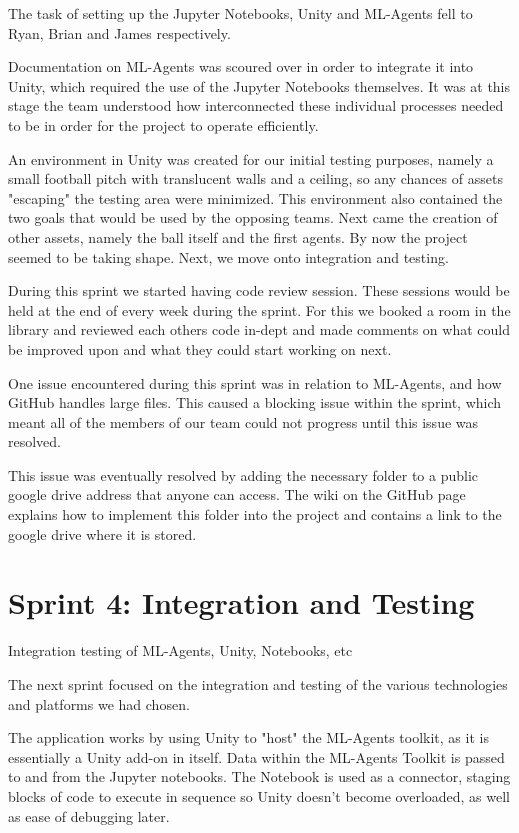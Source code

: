 	The task of setting up the Jupyter Notebooks, Unity and ML-Agents fell to Ryan, Brian and James respectively.
	
	Documentation on ML-Agents was scoured over in order to integrate it into Unity, which required the use of the Jupyter Notebooks themselves. It was at this stage the team understood how interconnected these individual processes needed to be in order for the project to operate efficiently.
	
	An environment in Unity was created for our initial testing purposes, namely a small football pitch with translucent walls and a ceiling, so any chances of assets "escaping" the testing area were minimized. This environment also contained the two goals that would be used by the opposing teams. Next came the creation of other assets, namely the ball itself and the first agents. By now the project seemed to be taking shape. Next, we move onto integration and testing.
	
	During this sprint we started having code review session. These sessions would be held at the end of every week during the sprint. For this we booked a room in the library and reviewed each others code in-dept and made comments on what could be improved upon and what they could start working on next.
	
	One issue encountered during this sprint was in relation to ML-Agents, and how GitHub handles large files. This caused a blocking issue within the sprint, which meant all of the members of our team could not progress until this issue was resolved. 
	
	This issue was eventually resolved by adding the necessary folder to a public google drive address that anyone can access. The wiki on the GitHub page explains how to implement this folder into the project and contains a link to the google drive where it is stored.

\section{Sprint 4: Integration and Testing}
	Integration testing of ML-Agents, Unity, Notebooks, etc
	
	The next sprint focused on the integration and testing of the various technologies and platforms we had chosen. 
	
	The application works by using Unity to "host" the ML-Agents toolkit, as it is essentially a Unity add-on in itself. Data within the ML-Agents Toolkit is passed to and from the Jupyter notebooks. The Notebook is used as a connector, staging blocks of code to execute in sequence so Unity doesn't become overloaded, as well as ease of debugging later.
	
